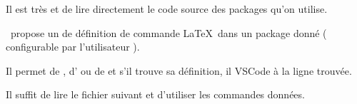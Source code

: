 \begin{Methode}
    Il est très  et  de lire directement le code source des packages qu'on utilise. 

    \bfcours\ propose un  de définition de commande \LaTeX\ dans un package donné ( configurable par l'utilisateur ).

    Il permet de , d' ou de  et s'il trouve sa définition, il  VSCode à la ligne trouvée.

    Il suffit de lire le fichier suivant et d'utiliser les commandes données.
    

\end{Methode}